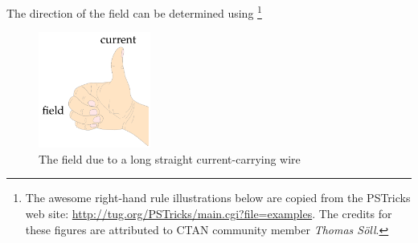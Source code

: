 The direction of the field can be determined using \footnote[][-2cm]{The awesome right-hand rule illustrations below are copied from the PSTricks web site: \url{http://tug.org/PSTricks/main.cgi?file=examples}. The credits for these figures are attributed to CTAN community member \emph{Thomas S\"{o}ll}.}

\begin{figure}[ht]
	\centering
\begin{minipage}{0.55\linewidth}
\begin{center}
\end{center}
\end{minipage}
\begin{minipage}{0.35\linewidth}
\begin{center}
\includegraphics[height=108pt]{right-hand-straight.pdf}
\end{center}
\end{minipage}

\caption{The field due to a long straight current-carrying wire}
\end{figure}

